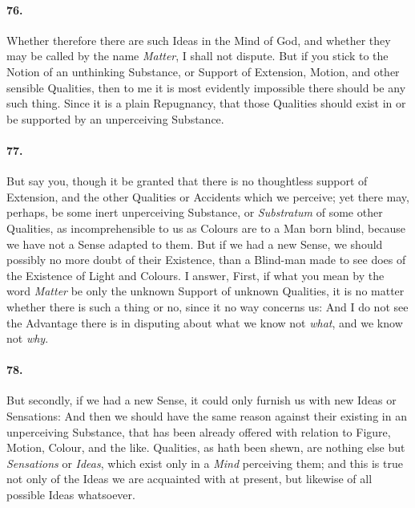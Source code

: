 \documentclass[]{article}
\newenvironment{sectionbody}{\begin{multicols}{2}}{\end{multicols}}
\begin{document}
\begin{sectionbody}
\paragraph{76.} Whether therefore there are such Ideas in the Mind of {\sc God}, and
whether they may be called by the name \emph{Matter}, I shall
not dispute.  But if you stick to the Notion of an unthinking
Substance, or Support of Extension, Motion, and other sensible
Qualities, then to me it is most evidently impossible there
should be any such thing.  Since it is a plain Repugnancy, that
those Qualities should exist in or be supported by an
unperceiving Substance.



\paragraph{77.} But say you, though it be granted that there is no thoughtless
support of Extension, and the other Qualities or Accidents which
we perceive; yet there may, perhaps, be some inert unperceiving
Substance, or \emph{Substratum} of some other Qualities, as
incomprehensible to us as Colours are to a Man born blind,
because we have not a Sense adapted to them.  But if we had a new
Sense, we should possibly no more doubt of their Existence, than
a Blind-man made to see does of the Existence of Light and
Colours.  I answer, First, if what you mean by the word
\emph{Matter} be only the unknown Support of unknown Qualities,
it is no matter whether there is such a thing or no, since it no
way concerns us: And I do not see the Advantage there is in
disputing about what we know not \emph{what}, and we know not
\emph{why}.



\paragraph{78.} But secondly, if we had a new Sense, it could only furnish us
with new Ideas or Sensations: And then we should have the same
reason against their existing in an unperceiving Substance, that
has been already offered with relation to Figure, Motion, Colour,
and the like.  Qualities, as hath been shewn, are nothing else
but \emph{Sensations} or \emph{Ideas}, which exist only in a
\emph{Mind} perceiving them; and this is true not only of the
Ideas we are acquainted with at present, but likewise of all
possible Ideas whatsoever.




\end{sectionbody}
\end{document}

